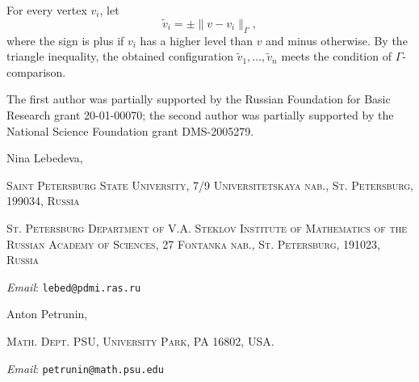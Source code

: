 \documentclass{article}
\makeatletter
\newcommand{\Addresses}{{\bigskip\footnotesize

\noindent Nina Lebedeva,
\par\nopagebreak
 \textsc{Saint Petersburg State University, 7/9 Universitetskaya nab., St. Petersburg, 199034, Russia}
\par
\nopagebreak
 \textsc{St. Petersburg Department of V.A. Steklov Institute of Mathematics of the Russian Academy of Sciences, 27 Fontanka nab., St. Petersburg, 191023, Russia}
  \par\nopagebreak
  \textit{Email}: \texttt{lebed@pdmi.ras.ru}

\medskip

\noindent   Anton Petrunin, 
\par\nopagebreak
 \textsc{Math. Dept. PSU, University Park, PA 16802, USA.}
  \par\nopagebreak
  \textit{Email}: \texttt{petrunin@math.psu.edu}
  
}}
\makeatother
\begin{document}
For every vertex $v_i$, let
\[\tilde v_i=\pm \|v-v_i\|_\Gamma,\]
where the sign is plus if $v_i$ has a higher level than $v$ and minus otherwise.
By the triangle inequality, the obtained configuration $\tilde v_1,\dots,\tilde v_n$ meets the condition of $\Gamma$-comparison.
\qeds

The first author was partially supported by the Russian Foundation for Basic Research grant 20-01-00070; the second author was partially supported by the National Science Foundation grant DMS-2005279.

{\sloppy
\printbibliography[heading=bibintoc]
\fussy
}

\Addresses
\end{document}
